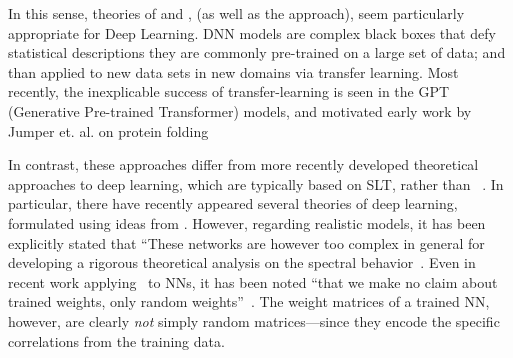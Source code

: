  In this sense, \SemiEmpirical theories of \NuclearPhysics and \QuantumChemistry,
 (as well as the \RenormalizationGroup approach),  seem particularly appropriate
  for Deep Learning.
  DNN models are complex black boxes that defy statistical descriptions  they are commonly pre-trained on a large set of data; and than applied to new data sets in new domains via transfer learning.
  Most recently, the inexplicable success of transfer-learning is seen
in the GPT (Generative Pre-trained Transformer) models\cite{Radford2018},
and motivated early work by Jumper et. al. on protein folding\cite{JKS16_TR}

In contrast, these \SemiEmpirical approaches differ from more
recently developed theoretical approaches to deep learning, which are typically based on SLT, rather than \STATMECH~\cite{Roberts2021}.
In particular, there have recently appeared several theories of deep learning, formulated using ideas from \RMT.
However, regarding realistic models, it has been explicitly stated that
``These networks are however too complex in general for developing a rigorous theoretical analysis on the spectral behavior~\cite{LBNx17_TR}.
Even in recent work applying \RMT~to NNs, it has been noted
``that we make no claim about trained weights, only random weights''~\cite{Yang2021}.
The weight matrices of a trained NN, however, are clearly \emph{not} simply random matrices---since they encode the specific correlations from the training data.


%
